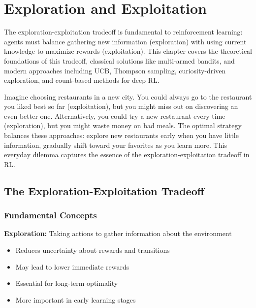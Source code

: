 \chapter{Exploration and Exploitation}
\label{ch:exploration-exploitation}

\begin{keyideabox}
The exploration-exploitation tradeoff is fundamental to reinforcement learning: agents must balance gathering new information (exploration) with using current knowledge to maximize rewards (exploitation). This chapter covers the theoretical foundations of this tradeoff, classical solutions like multi-armed bandits, and modern approaches including UCB, Thompson sampling, curiosity-driven exploration, and count-based methods for deep RL.
\end{keyideabox}

\begin{intuitionbox}
Imagine choosing restaurants in a new city. You could always go to the restaurant you liked best so far (exploitation), but you might miss out on discovering an even better one. Alternatively, you could try a new restaurant every time (exploration), but you might waste money on bad meals. The optimal strategy balances these approaches: explore new restaurants early when you have little information, gradually shift toward your favorites as you learn more. This everyday dilemma captures the essence of the exploration-exploitation tradeoff in RL.
\end{intuitionbox}

\section{The Exploration-Exploitation Tradeoff}

\subsection{Fundamental Concepts}

\textbf{Exploration:} Taking actions to gather information about the environment
\begin{itemize}
    \item Reduces uncertainty about rewards and transitions
    \item May lead to lower immediate rewards
    \item Essential for long-term optimality
    \item More important in early learning stages
\end{itemize}

